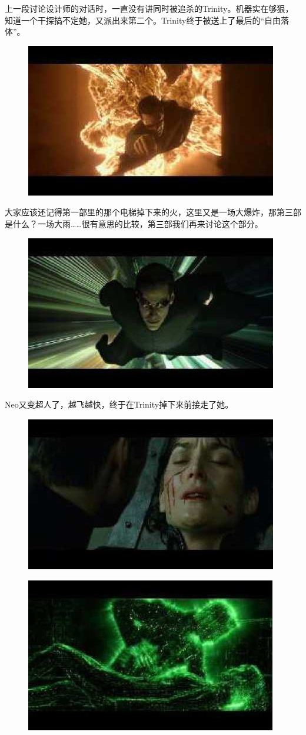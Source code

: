 \documentclass[UTF8]{ctexart}
\begin{document}
上一段讨论设计师的对话时，一直没有讲同时被追杀的Trinity。机器实在够狠，知道一个干探搞不定她，又派出来第二个。Trinity终于被送上了最后的“自由落体”。

\begin{figure}[htb]
\centering
\includegraphics[width=0.5\linewidth]{fig/read_reloaded-171}
\end{figure}

大家应该还记得第一部里的那个电梯掉下来的火，这里又是一场大爆炸，那第三部是什么？一场大雨……很有意思的比较，第三部我们再来讨论这个部分。

\begin{figure}[htb]
\centering
\includegraphics[width=0.5\linewidth]{fig/read_reloaded-172}
\end{figure}

Neo又变超人了，越飞越快，终于在Trinity掉下来前接走了她。

\begin{figure}[htb]
\centering
\includegraphics[width=0.5\linewidth]{fig/read_reloaded-173}
\end{figure}

\begin{figure}[htb]
\centering
\includegraphics[width=0.5\linewidth]{fig/read_reloaded-173-1}
\end{figure}
\end{document}
